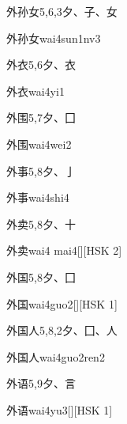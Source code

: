 \begin{entry}{外孙女}{5,6,3}{⼣、⼦、⼥}
  \begin{phonetics}{外孙女}{wai4sun1nv3}
  \end{phonetics}
\end{entry}

\begin{entry}{外衣}{5,6}{⼣、⾐}
  \begin{phonetics}{外衣}{wai4yi1}
  \end{phonetics}
\end{entry}

\begin{entry}{外围}{5,7}{⼣、⼞}
  \begin{phonetics}{外围}{wai4wei2}
  \end{phonetics}
\end{entry}

\begin{entry}{外事}{5,8}{⼣、⼅}
  \begin{phonetics}{外事}{wai4shi4}
  \end{phonetics}
\end{entry}

\begin{entry}{外卖}{5,8}{⼣、⼗}
  \begin{phonetics}{外卖}{wai4 mai4}[][HSK 2]
  \end{phonetics}
\end{entry}

\begin{entry}{外国}{5,8}{⼣、⼞}
  \begin{phonetics}{外国}{wai4guo2}[][HSK 1]
  \end{phonetics}
\end{entry}

\begin{entry}{外国人}{5,8,2}{⼣、⼞、⼈}
  \begin{phonetics}{外国人}{wai4guo2ren2}
  \end{phonetics}
\end{entry}

\begin{entry}{外语}{5,9}{⼣、⾔}
  \begin{phonetics}{外语}{wai4yu3}[][HSK 1]
  \end{phonetics}
\end{entry}

